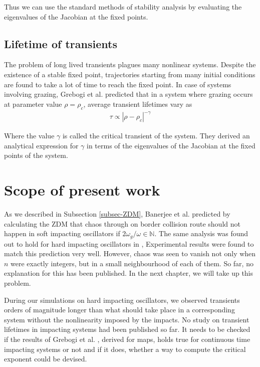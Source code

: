 \documentclass{book}
\renewcommand{\(}{\begin{columns}}
\renewcommand{\)}{\end{columns}}
\newcommand{\<}[1]{\begin{column}{#1}}
\renewcommand{\>}{\end{column}}
\begin{document}
Thus we can use the standard methods of stability analysis by evaluating the 
eigenvalues of the Jacobian at the fixed points.  

\subsection{Lifetime of transients}
The problem of long lived transients plagues many nonlinear systems. Despite 
the existence of a stable fixed point, trajectories starting from many initial 
conditions are found to take a lot of time to reach the fixed point.  In case 
of systems involving grazing, Grebogi et al.\cite{grebogi-transient} predicted 
that in a system where grazing occurs at parameter value $\rho=\rho_c$, 
average transient lifetimes vary as
\begin{align}
\label{form-transient-life}
\tau\propto |\rho-\rho_c|^{-\gamma}
\end{align}

Where the value $\gamma$ is called the critical transient of the system.  They 
derived an analytical expression for $\gamma$ in terms of the eigenvalues of 
the Jacobian at the fixed points of the system.  

\section{Scope of present work}
As we described in Subsection \ref{subsec-ZDM}, Banerjee et al. predicted by 
calculating the ZDM that 
chaos through on border collision route should not happen in soft impacting 
oscillators if $2\omega_g/\omega\in\mathbb{N}$.  The same analysis was found out 
to hold for hard impacting oscillators in \cite{banerjee-kundu-hard}, Experimental results were found 
to match this prediction very well. However, chaos was seen to vanish not only when $n$ were exactly 
integers, but in a small neighbourhood of each of them.  So far, no 
explanation for this has been published.  In the next chapter, we will 
take up this problem.  

During our simulations on hard impacting oscillators, we observed transients 
orders of magnitude longer than what should take place in a corresponding system 
without the nonlinearity imposed by the impacts. No study on transient 
lifetimes in impacting systems had been published so far.  It needs to be 
checked if the results of 
Grebogi et al. \cite{grebogi-transient}, derived for maps,  holds true for 
continuous time impacting systems or 
not and if it does, whether a way to compute the critical exponent could be 
devised.  
\end{document}
